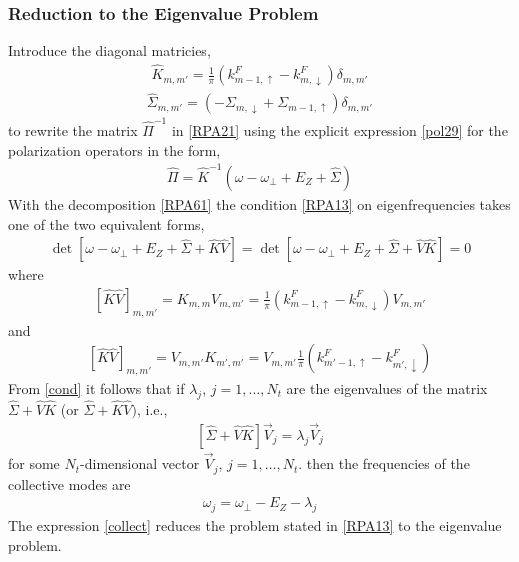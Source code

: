 \subsubsection{Reduction to the Eigenvalue Problem}
Introduce the diagonal matricies,
\begin{align}\label{hat_K}
\hat{K}_{m,m'} = \frac{1}{\pi} \left( k^{F}_{m-1,\uparrow} - k^{F}_{m,\downarrow} \right)\delta_{m,m'}
\end{align}
%
\begin{align}\label{hat_Sigma}
\hat{\Sigma}_{m,m'} = \left(- \Sigma_{m,\downarrow} + \Sigma_{m-1,\uparrow}\right) \delta_{m,m'}
\end{align}
to rewrite the matrix $\hat{\Pi}^{-1}$ in \eqref{RPA21} using the explicit expression \eqref{pol29} for the polarization operators in the form,
\begin{align}\label{RPA61}
\hat{\Pi} = \hat{K}^{-1} \left( \omega - \omega_{\perp} + E_Z + \hat{\Sigma} \right)
\end{align}
With the decomposition \eqref{RPA61} the condition \eqref{RPA13} on eigenfrequencies takes one of the two equivalent forms,
\begin{align}\label{cond}
\det \left[  \omega - \omega_{\perp} + E_Z + \hat{\Sigma}  + \hat{K} \hat{V} \right] = 
\det \left[  \omega - \omega_{\perp} + E_Z + \hat{\Sigma}  + \hat{V} \hat{K}  \right] = 0
\end{align}
where 
\begin{align}\label{KV}
\left[ \hat{K} \hat{V} \right]_{m,m'} = K_{m,m} V_{m,m'} = \frac{1}{\pi}\left( k^{F}_{m-1,\uparrow} - k^{F}_{m,\downarrow} \right) V_{m,m'}
\end{align}
and 
\begin{align}\label{VK}
\left[ \hat{K} \hat{V} \right]_{m,m'} =  V_{m,m'} K_{m',m'} = V_{m,m'} \frac{1}{\pi}\left( k^{F}_{m'-1,\uparrow} - k^{F}_{m',\downarrow} \right)
\end{align}
%
From \eqref{cond} it follows that if $\lambda_{j}$, $j = 1, \ldots, N_t$ are the eigenvalues of the matrix $\hat{\Sigma} + \hat{V} \hat{K}$ (or $\hat{\Sigma} + \hat{K} \hat{V} )$, i.e.,
\begin{align}
\left[\hat{\Sigma} + \hat{V} \hat{K}\right] \vec{V}_j= \lambda_j  \vec{V}_j
\end{align}
for some $N_t$-dimensional vector $\vec{V}_j$, $j = 1, \ldots, N_t$.
then the frequencies of the collective modes are
\begin{align}\label{collect}
\omega_j = \omega_{\perp} - E_Z - \lambda_j
\end{align}
The expression \eqref{collect} reduces the problem stated in \eqref{RPA13} to the eigenvalue problem.








